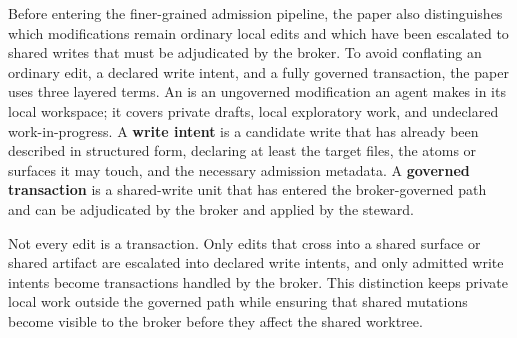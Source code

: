 \documentclass[9pt,letterpaper]{extarticle}
\begin{document}
Before entering the finer-grained admission pipeline, the paper also distinguishes which modifications remain ordinary local edits and which have been escalated to shared writes that must be adjudicated by the broker. To avoid conflating an ordinary edit, a declared write intent, and a fully governed transaction, the paper uses three layered terms. An \texttt{} is an ungoverned modification an agent makes in its local workspace; it covers private drafts, local exploratory work, and undeclared work-in-progress. A \textbf{write intent} is a candidate write that has already been described in structured form, declaring at least the target files, the atoms or surfaces it may touch, and the necessary admission metadata. A \textbf{governed transaction} is a shared-write unit that has entered the broker-governed path and can be adjudicated by the broker and applied by the steward.

Not every edit is a transaction. Only edits that cross into a shared surface or shared artifact are escalated into declared write intents, and only admitted write intents become transactions handled by the broker. This distinction keeps private local work outside the governed path while ensuring that shared mutations become visible to the broker before they affect the shared worktree.
\end{document}

